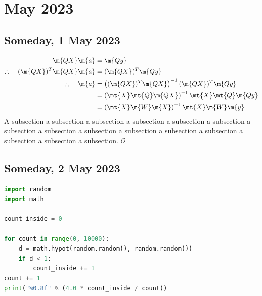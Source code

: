 \chapter[2023 May]{May 2023}

\section[2023/05/01]{Someday, 1 May 2023}
\label{sec:20230501}

\lipsum
\begin{align}
  \m{QX} \m{a} & = \m{Qy} \notag \\
  \therefore \quad (\m{QX})^T \m{QX} \m{a} & = (\m{QX})^T \m{Qy} \notag \\
  \therefore \quad \m{a} & = \left( (\m{QX})^T \m{QX} \right)^{-1} (\m{QX})^T \m{Qy} \notag \\
        & = \left( \mt{X} \mt{Q} \m{QX} \right)^{-1} \mt{X} \mt{Q} \m{Qy} \notag \\
        & = \left( \mt{X} \m{W} \m{X} \right)^{-1} \mt{X} \m{W} \m{y}
          \label{eqn:weightedleastsquares}
\end{align}
A subsection a subsection a subsection a subsection a subsection a
subsection a subsection a subsection a subsection a subsection a
subsection a subsection a subsection a subsection a subsection.
$\mathcal O$

\pendsign

\section[2023/05/02]{Someday, 2 May 2023}

\begin{lstlisting}[language=Python,title={Monte Carlo approximation of $\pi$}]
import random
import math

count_inside = 0

for count in range(0, 10000):
    d = math.hypot(random.random(), random.random())
    if d < 1:
        count_inside += 1
count += 1
print("%0.8f" % (4.0 * count_inside / count))
\end{lstlisting}

